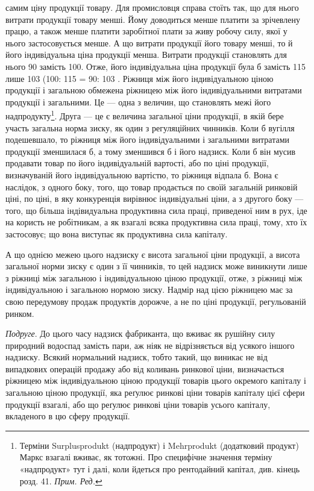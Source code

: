 \parcont{}  %
самим ціну продукції товару. Для промисловця справа стоїть так, що для нього
витрати продукції товару менші. Йому доводиться менше платити за зрічевлену
працю, а також менше платити заробітної плати за живу робочу силу, якої
у нього застосовується менше. А що витрати продукції його товару менші,
то й його індивідуальна ціна продукції менша. Витрати продукції становлять для
нього 90 замість 100. Отже, його індивідуальна ціна продукції була б замість
115 лише 103  (100: 115 = 90: 103 . Ріжниця між його індивідуальною ціною
продукції і загальною обмежена ріжницею між його індивідуальними витратами
продукції і загальними. Це — одна з величин, що становлять межі його надпродукту\footnote{Терміни Surplusprodukt (надпродукт) і Mehrprodukt (додатковий продукт) Маркс взагалі вживає,
як тотожні. Про специфічне значення терміну «надпродукт» тут і далі, коли йдеться
про рентодайний капітал, див. кінець розд. 41. \emph{Прим. Ред.}}. Друга — це є величина загальної ціни продукції, в якій бере участь
загальна норма зиску, як один з регуляційних чинників. Коли б вугілля подешевшало,
то ріжниця між його індивідуальними і загальними витратами продукції
зменшилася б, а тому зменшився б і його надзиск. Коли б він мусив продавати
товар по його індивідуальній вартості, або по ціні продукції, визначуваній
його індивідуальною вартістю, то ріжниця відпала б. Вона є наслідок, з одного
боку, того, що товар продається по своїй загальній ринковій ціні, по ціні,
в яку конкуренція вирівнює індивідуальні ціни, а з другого боку — того, що
більша індівидуальна продуктивна сила праці, приведеної ним в рух, іде на користь
не робітникам, а як взагалі всяка продуктивна сила праці, тому, хто їх
застосовує; що вона виступає як продуктивна сила капіталу.

А що однією межею цього надзиску є висота загальної ціни продукції,
а висота загальної норми зиску є один з її чинників, то цей надзиск може
виникнути лише з ріжниці між загальною і індивідуальною ціною продукції,
отже, з ріжниці між індивідуальною і загальною нормою зиску. Надмір над цією
ріжницею має за свою передумову продаж продуктів дорожче, а не по ціні
продукції, регульованій ринком.

\emph{Подруге}. До цього часу надзиск фабриканта, що вживає як рушійну силу
природний водоспад замість пари, аж ніяк не відрізняється від усякого іншого
надзиску. Всякий нормальний надзиск, тобто такий, що виникає не від випадкових
операцій продажу або від коливань ринкової ціни, визначається ріжницею між
індивідуальною ціною продукції товарів цього окремого капіталу і загальною
ціною продукції, яка реґулює ринкові ціни товарів капіталу цієї сфери продукції
взагалі, або що реґулює ринкові ціни товарів усього капіталу, вкладеного в цю
сферу продукції.

